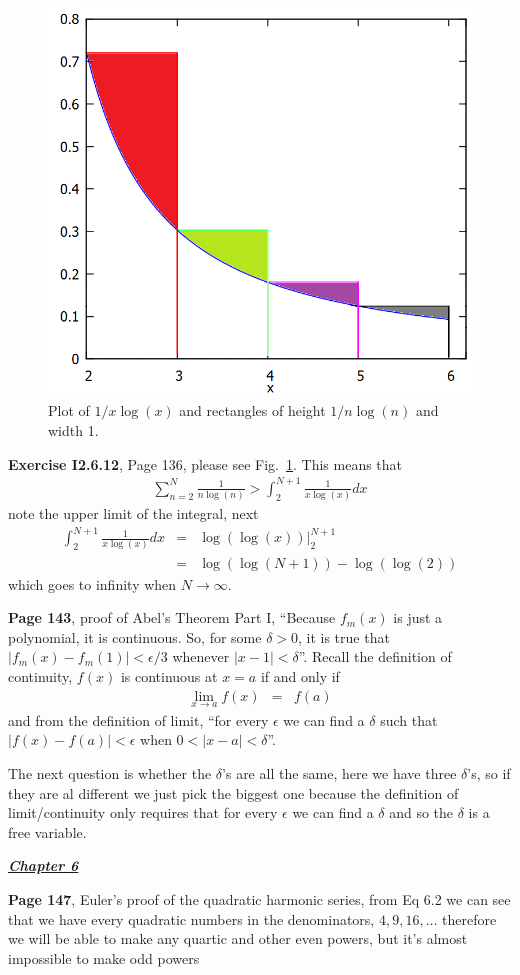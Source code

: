 \documentclass[aps,preprint,preprintnumbers,nofootinbib,showpacs,prd]{revtex4-1}
\newcommand{\nbea}{\begin{eqnarray*}}
\newcommand{\neea}{\end{eqnarray*}}
\begin{document}
%
\begin{figure}
\centering
  \includegraphics[width=.7\linewidth]{ExerciseI2_6_12.png}
  \caption{Plot of $1/x\log(x)$ and rectangles of height $1/n\log(n)$ and width 1.}
\label{fig:I2.6.12}
\end{figure}
%
{\bf Exercise I2.6.12}, Page 136, please see Fig.~\ref{fig:I2.6.12}. This means that
%
\nbea
\sum_{n=2}^N \frac{1}{n\log(n)} > \int_2^{N+1} \frac{1}{x\log(x)} dx
\neea
%
note the upper limit of the integral, next
%
\nbea
\int_2^{N+1} \frac{1}{x\log(x)} dx & = & \left.\log(\log(x))\right|_2^{N+1} \\
& = & \log(\log(N+1)) - \log(\log(2))
\neea
%
which goes to infinity when $N\to\infty$.

{\bf Page 143}, proof of Abel's Theorem Part I, ``Because $f_m(x)$ is just a polynomial, it is continuous. So, for some $\delta>0$, it is true that $|f_m(x) - f_m(1)|<\epsilon/3$ whenever $|x-1|<\delta$''. Recall the definition of continuity, $f(x)$ is continuous at $x=a$ if and only if
%
\nbea
\lim_{x\to a} f(x) & = & f(a)
\neea
%
and from the definition of limit, ``for every $\epsilon$ we can find a $\delta$ such that $|f(x) - f(a)|<\epsilon$ when $0 <|x-a|<\delta$''.

The next question is whether the $\delta$'s are all the same, here we have three $\delta$'s, so if they are al different we just pick the biggest one because the definition of limit/continuity only requires that for every $\epsilon$ we can find a $\delta$ and so the $\delta$ is a free variable.

\bigskip
\underline{\textit{\textbf{Chapter 6}}}
\bigskip

{\bf Page 147}, Euler's proof of the quadratic harmonic series, from Eq 6.2 we can see that we have every quadratic numbers in the denominators, $4,9,16,\ldots$ therefore we will be able to make any quartic and other even powers, but it's almost impossible to make odd powers
\end{document}
